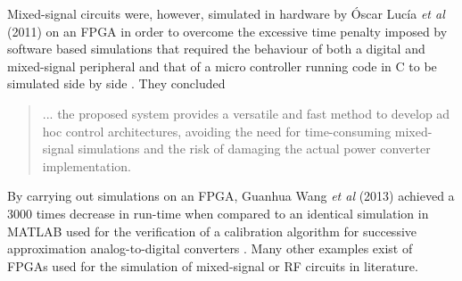 Mixed-signal circuits were, however, simulated in hardware by \'{O}scar Luc\'{i}a \textit{et al} (2011) on an \ac{FPGA} in order to overcome the excessive time penalty imposed by software based simulations that required the behaviour of both a digital and mixed-signal peripheral and that of a micro controller running code in C to be simulated side by side \cite{lucia2011real}. They concluded
\begin{quotation}
	... the proposed system provides a versatile and fast method to develop ad hoc control architectures, avoiding the need for time-consuming mixed-signal simulations and the risk of damaging the actual power converter implementation.

\end{quotation}
By carrying out simulations on an \ac{FPGA}, Guanhua Wang \textit{et al} (2013) achieved a 3000 times decrease in run-time when compared to an identical simulation in MATLAB used for the verification of a calibration algorithm for successive approximation analog-to-digital converters \cite{wang2013fast}. Many other examples exist of \ac{FPGA}s used for the simulation of mixed-signal or \acl{RF} circuits in literature.



















